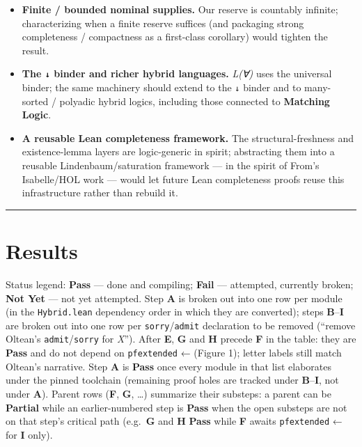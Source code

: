 \documentclass[11pt,a4paper]{article}
\renewcommand{\_}{\origtextunderscore\allowbreak}
\begin{document}
\begin{itemize}
\item
  \textbf{Finite / bounded nominal supplies.} Our reserve is countably infinite; characterizing when a finite reserve suffices (and packaging strong completeness / compactness as a first-class corollary) would tighten the result.
\item
  \textbf{The \texttt{↓} binder and richer hybrid languages.} \emph{L(∀)} uses the universal binder; the same machinery should extend to the \texttt{↓} binder and to many-sorted / polyadic hybrid logics, including those connected to \textbf{Matching Logic}.
\item
  \textbf{A reusable Lean completeness framework.} The structural-freshness and existence-lemma layers are logic-generic in spirit; abstracting them into a reusable Lindenbaum/saturation framework --- in the spirit of From's Isabelle/HOL work --- would let future Lean completeness proofs reuse this infrastructure rather than rebuild it.
\end{itemize}

\begin{center}\rule{0.5\linewidth}{0.5pt}\end{center}

\hypertarget{results}{%
\section{Results}\label{results}}

Status legend: \textbf{Pass} --- done and compiling; \textbf{Fail} --- attempted, currently broken; \textbf{Not Yet} --- not yet attempted. Step \textbf{A} is broken out into one row per module (in the \texttt{Hybrid.lean} dependency order in which they are converted); steps \textbf{B}--\textbf{I} are broken out into one row per \texttt{sorry}/\texttt{admit} declaration to be removed (``remove Oltean's \texttt{admit}/\texttt{sorry} for \emph{X}''). After \textbf{E}, \textbf{G} and \textbf{H} precede \textbf{F} in the table: they are \textbf{Pass} and do not depend on \texttt{pf\_extended} ← (Figure 1); letter labels still match Oltean's narrative. Step \textbf{A} is \textbf{Pass} once every module in that list elaborates under the pinned toolchain (remaining proof holes are tracked under \textbf{B}--\textbf{I}, not under \textbf{A}). Parent rows (\textbf{F}, \textbf{G}, \ldots) summarize their substeps: a parent can be \textbf{Partial} while an earlier-numbered step is \textbf{Pass} when the open substeps are not on that step's critical path (e.g.~\textbf{G} and \textbf{H} \textbf{Pass} while \textbf{F} awaits \texttt{pf\_extended} ← for \textbf{I} only).
\end{document}
